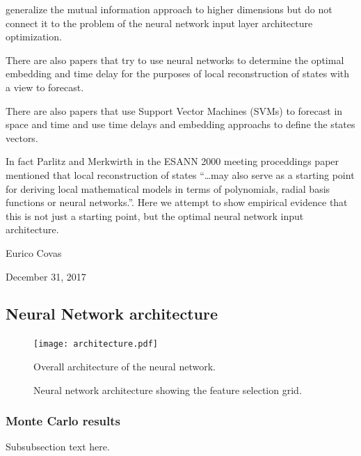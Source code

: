 \documentclass[journal]{IEEEtran}
\begin{document}
\cite{Simon:2007:HDS:1230147.1230294} generalize the mutual information approach to higher dimensions but do not connect it to the problem of the 
neural network input layer architecture optimization.

There are also papers \cite{articleRagulskis} that try to use neural networks to determine the optimal embedding and time delay for the purposes of local
reconstruction of states with a view to forecast.

There are also papers \cite{Xia2006APF} that use Support Vector Machines (SVMs) to forecast in space and time and use time delays and embedding approachs to define
the states vectors.

In fact Parlitz and Merkwirth \cite{Parlitz2000NonlinearPO} in the
ESANN 2000 meeting proceddings paper mentioned that local reconstruction of states ``\ldots may also serve as
a starting point for deriving local mathematical models in terms of polynomials,
radial basis functions or neural networks.''. Here we attempt to show empirical evidence that this is not just 
a starting point, but the optimal neural network input architecture.

\hfill Eurico Covas
 
\hfill December 31, 2017

\subsection{Neural Network architecture}

\begin{figure}[!ht]
\centering
\texttt{[image: architecture.pdf]}
\caption{Overall architecture of the neural network.}
\label{architecture}
\end{figure}

\begin{figure}[!ht]
\centering
{}
\caption{Neural network architecture showing the feature selection grid.}
\label{NeuralNetwork}
\end{figure}



\subsubsection{Monte Carlo results}
Subsubsection text here.
\end{document}
